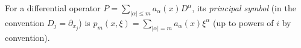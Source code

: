 
For a differential operator $P=\sum_{|\alpha|\le m}a_\alpha(x)D^\alpha$, its \emph{principal symbol} (in the convention $D_j=\partial_{x_j}$) is $p_m(x,\xi)=\sum_{|\alpha|=m}a_\alpha(x)\xi^\alpha$ (up to powers of $i$ by convention).
